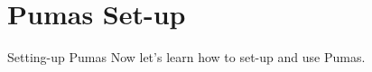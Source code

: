 \section{Pumas Set-up}
\begin{frame}{Setting-up Pumas}
    Now let's learn how to set-up and use Pumas.
\end{frame}